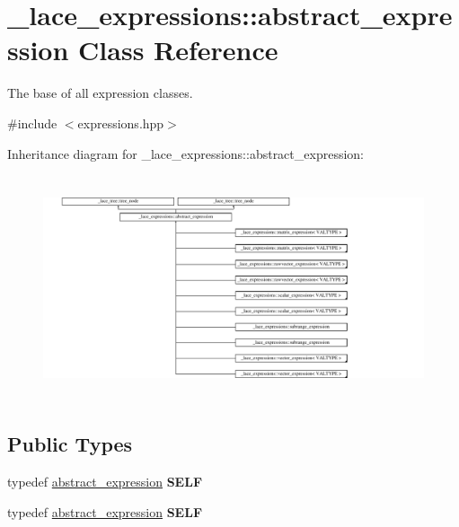 \hypertarget{class__lace__expressions_1_1abstract__expression}{\section{\-\_\-lace\-\_\-expressions\-:\-:abstract\-\_\-expression Class Reference}
\label{class__lace__expressions_1_1abstract__expression}
}


The base of all expression classes.  




{\ttfamily \#include $<$expressions.\-hpp$>$}

Inheritance diagram for \-\_\-lace\-\_\-expressions\-:\-:abstract\-\_\-expression\-:\begin{figure}[H]
\begin{center}
\leavevmode
\includegraphics[height=6.646884cm]{class__lace__expressions_1_1abstract__expression}
\end{center}
\end{figure}
\subsection*{Public Types}
\begin{DoxyCompactItemize}
\item 
\hypertarget{class__lace__expressions_1_1abstract__expression_a8ab596fc1b8603f5fb683c959eb69731}{typedef \hyperlink{class__lace__expressions_1_1abstract__expression}{abstract\-\_\-expression} {\bfseries S\-E\-L\-F}}\label{class__lace__expressions_1_1abstract__expression_a8ab596fc1b8603f5fb683c959eb69731}

\item 
\hypertarget{class__lace__expressions_1_1abstract__expression_a8ab596fc1b8603f5fb683c959eb69731}{typedef \hyperlink{class__lace__expressions_1_1abstract__expression}{abstract\-\_\-expression} {\bfseries S\-E\-L\-F}}\label{class__lace__expressions_1_1abstract__expression_a8ab596fc1b8603f5fb683c959eb69731}

\end{DoxyCompactItemize}
